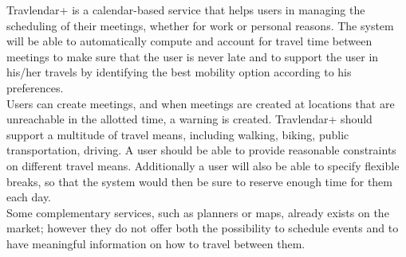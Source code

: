 Travlendar+ is a calendar-based service that helps users in managing the scheduling of their meetings, whether for work or personal reasons. The system will be able to automatically compute and account for travel time between meetings to make sure that the user is never late and to support the user in his/her travels by identifying the best mobility option according to his preferences. \\
Users can create meetings, and when meetings are created at locations that are unreachable in the allotted time, a warning is created. Travlendar+ should support a multitude of travel means, including walking, biking, public transportation, driving. A user should be able to provide reasonable constraints on different travel means. Additionally a user will also be able to specify flexible breaks, so that the system would then be sure to reserve enough time for them each day. \\
Some complementary services, such as planners or maps, already exists on the market; however they do not offer both the possibility to schedule events and to have meaningful information on how to travel between them.